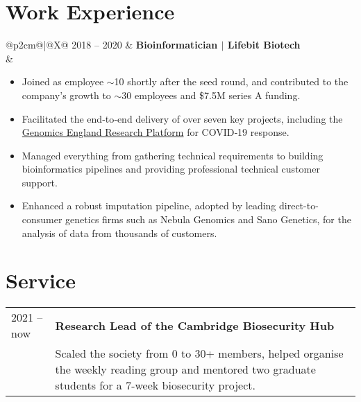 \documentclass[letterpaper,11pt]{article}
\begin{document}
\section{\textbf{Work Experience}}
\vspace{3pt}
\begin{tabularx}{\linewidth}{@{}p{2cm}@{\hspace{5pt}}|@{\hspace{5pt}}X@{}}
  2018 -- 2020 & 
  \textbf{Bioinformatician $|$ Lifebit Biotech} \\
  & \begin{minipage}[t]{\linewidth}
      \begin{itemize}[noitemsep]
          \item Joined as employee $\sim$10 shortly after the seed round, and contributed to the company's growth to $\sim$30 employees and \$7.5M series A funding.
          \item Facilitated the end‐to‐end delivery of over seven key projects, including the \href{https://www.genomicsengland.co.uk/news/research-environment-covid-19-lifebit-aws}{\color{teal}Genomics England Research Platform} for COVID‐19 response.
          \item Managed everything from gathering technical requirements to building bioinformatics pipelines and providing professional technical customer support.
          \item Enhanced a robust imputation pipeline, adopted by leading direct-to-consumer genetics firms such as Nebula Genomics and Sano Genetics, for the analysis of data from thousands of customers.
      \end{itemize}
  \end{minipage}
\end{tabularx}




\section{\textbf{Service}}
\begin{tabularx}{\linewidth}{@{}p{2cm}@{\hspace{5pt}}|@{\hspace{5pt}}X@{}}
    2021 -- now & 
    \textbf{Research Lead of the Cambridge Biosecurity Hub} \\
    & Scaled the society from 0 to 30+ members, helped organise the weekly reading group and mentored two graduate students for a 7-week biosecurity project.
\end{tabularx}
\end{document}
